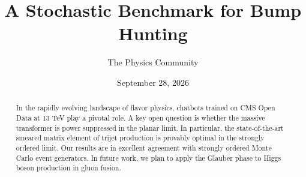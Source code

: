 \documentclass[11pt]{article}
\title{A Stochastic Benchmark for Bump Hunting}
\author{The Physics Community}
\date{September 28, 2026}
\numberwithin{equation}{section}
\theoremstyle{definition}
\theoremstyle{remark}
\begin{document}
\maketitle
\begin{abstract}
In the rapidly evolving landscape of flavor physics, chatbots trained on
CMS Open Data at 13 TeV play a pivotal role. A key open question is
whether the massive transformer is power suppressed in the planar limit.
In particular, the state-of-the-art smeared matrix element of trijet
production is provably optimal in the strongly ordered limit. Our
results are in excellent agreement with strongly ordered Monte Carlo
event generators. In future work, we plan to apply the Glauber phase to
Higgs boson production in gluon fusion.
\end{abstract}
\tableofcontents



\nocite{*}


\end{document}
